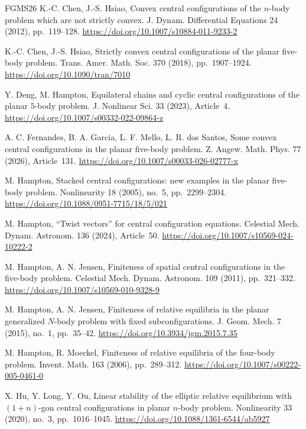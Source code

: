 \documentclass[Threeside,11pt]{article}
\theoremstyle{definition}
\theoremstyle{remark}
\numberwithin{equation}{section}
\theoremstyle{remark}
\begin{document}
\begin{thebibliography}{FGMS26}
K.-C. Chen, J.-S. Hsiao,
Convex central configurations of the $n$-body problem which are not strictly convex.
J. Dynam. Differential Equations 24 (2012), pp.~119--128.
\url{https://doi.org/10.1007/s10884-011-9233-2}

K.-C. Chen, J.-S. Hsiao,
Strictly convex central configurations of the planar five-body problem.
Trans. Amer. Math. Soc. 370 (2018), pp.~1907--1924.
\url{https://doi.org/10.1090/tran/7010}

Y. Deng, M. Hampton,
Equilateral chains and cyclic central configurations of the
planar $5$-body problem.
J. Nonlinear Sci. 33 (2023), Article~4.
\url{https://doi.org/10.1007/s00332-022-09864-z}

A. C. Fernandes, B. A. Garcia, L. F. Mello, L. R. dos Santos,
Some convex central configurations in the planar five-body problem.
Z. Angew. Math. Phys. 77 (2026), Article~131.
\url{https://doi.org/10.1007/s00033-026-02777-x}

M. Hampton,
Stacked central configurations: new examples in the planar five-body problem.
Nonlinearity 18 (2005), no.~5, pp.~2299--2304.
\url{https://doi.org/10.1088/0951-7715/18/5/021}

M. Hampton,
``Twist vectors'' for central configuration equations.
Celestial Mech. Dynam. Astronom. 136 (2024), Article~50.
\url{https://doi.org/10.1007/s10569-024-10222-2}

M. Hampton, A. N. Jensen,
Finiteness of spatial central configurations in the
five-body problem.
Celestial Mech. Dynam. Astronom. 109 (2011), pp.~321--332.
\url{https://doi.org/10.1007/s10569-010-9328-9}

M. Hampton, A. N. Jensen,
Finiteness of relative equilibria in the planar generalized $N$-body
problem with fixed subconfigurations.
J. Geom. Mech. 7 (2015), no.~1, pp.~35--42.
\url{https://doi.org/10.3934/jgm.2015.7.35}

M. Hampton, R. Moeckel,
Finiteness of relative equilibria of the four-body problem.
Invent. Math. 163 (2006), pp.~289--312.
\url{https://doi.org/10.1007/s00222-005-0461-0}

X. Hu, Y. Long, Y. Ou,
Linear stability of the elliptic relative equilibrium
with $(1+n)$-gon central configurations in planar $n$-body problem.
Nonlinearity 33 (2020), no.~3, pp.~1016--1045.
\url{https://doi.org/10.1088/1361-6544/ab5927}


\end{thebibliography}
\end{document}
